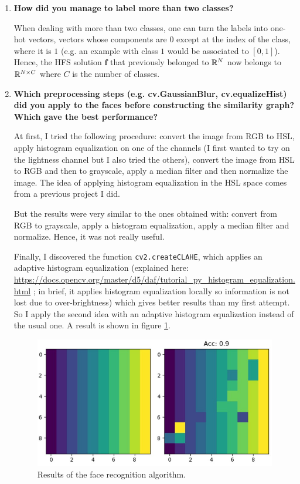 \documentclass[a4paper, 11pt]{report}
\begin{document}
\begin{enumerate}
	\item \textbf{How did you manage to label more than two classes?}
	
	When dealing with more than two classes, one can turn the labels into one-hot vectors, \ie vectors whose components are $0$ except at the index of the class, where it is $1$ (e.g. an example with class $1$ would be associated to $[0, 1]$). Hence, the HFS solution $\mathbf{f}$ that previously belonged to $\mathbb{R}^{N}$ now belongs to $\mathbb{R}^{N \times C}$ where $C$ is the number of classes.
	
	\item \textbf{Which preprocessing steps (e.g. cv.GaussianBlur, cv.equalizeHist) did you apply to the faces before constructing the similarity graph? Which gave the best performance?}
	
	At first, I tried the following procedure: convert the image from RGB to HSL, apply histogram equalization on one of the channels (I first wanted to try on the lightness channel but I also tried the others), convert the image from HSL to RGB and then to grayscale, apply a median filter and then normalize the image. The idea of applying histogram equalization in the HSL space comes from a previous project I did.
	
	But the results were very similar to the ones obtained with: convert from RGB to grayscale, apply a histogram equalization, apply a median filter and normalize. Hence, it was not really useful. 
	
	Finally, I discovered the function \texttt{cv2.createCLAHE}, which applies an adaptive histogram equalization (explained here: \url{https://docs.opencv.org/master/d5/daf/tutorial_py_histogram_equalization.html} ; in brief, it applies histogram equalization locally so information is not lost due to over-brightness) which gives better results than my first attempt. So I apply the second idea with an adaptive histogram equalization instead of the usual one.
	A result is shown in figure \ref{fig:q22-results}.
	
	\begin{figure}
	    \centering
	    \includegraphics[width=.6\textwidth]{images/q22_results}
	    \caption{Results of the face recognition algorithm.}
	    \label{fig:q22-results}
	\end{figure}
	

\end{enumerate}
\end{document}
